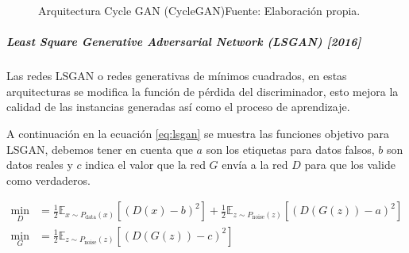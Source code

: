 
\begin{figure}[H]
    \centering
    \centerline{}
    \caption{Arquitectura Cycle GAN (CycleGAN)\newline{}Fuente: Elaboración propia.}
    \label{fig:CycleGAN-2}
\end{figure}




\subparagraph{Least Square Generative Adversarial Network (LSGAN) [2016]}
Las redes \gls{LSGAN} \cite{LSGAN-mao2017squares} o redes generativas de mínimos cuadrados, en estas arquitecturas se modifica la función de pérdida del discriminador, esto mejora la calidad de las instancias generadas así como el proceso de aprendizaje.

A continuación en la ecuación \ref{eq:lsgan} se muestra las funciones objetivo para \gls{LSGAN}, debemos tener en cuenta que ${a}$ son los etiquetas para datos falsos, ${b}$ son datos reales y ${c}$ indica el valor que la red ${G}$ envía a la red ${D}$ para que los valide como verdaderos.

\begin{equation}
    \begin{split}
        \min_{D} &= \frac{1}{2} \mathbb{E}_{x\sim{}P_{\text{data}}(x)}  \left[ (D(x) - b)^{2} \right] + \frac{1}{2} \mathbb{E}_{z\sim{}P_{\text{noise}}(z)} \left[ (D(G(z)) - a)^{2} \right]    \\
        \min_{G} &= \frac{1}{2} \mathbb{E}_{z\sim{}P_{\text{noise}}(z)} \left[ (D(G(z)) - c)^{2} \right]                                                                                        \\
    \end{split}
    \label{eq:lsgan}
\end{equation}

